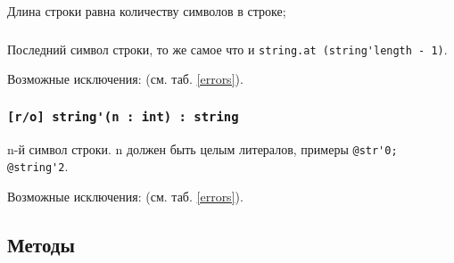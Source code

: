 Длина строки равна количеству символов в строке;

\subsubsection{}

Последний символ строки, то же самое что и \lstinline|string.at (string'length - 1)|.

Возможные исключения:  (см. таб. \ref{errors}).

\subsubsection{\lstinline|[r/o] string'(n : int) : string|}

n-й символ строки. n должен быть целым литералов, примеры \lstinline|@str'0; @string'2|.

Возможные исключения:  (см. таб. \ref{errors}).

\subsection{Методы}

